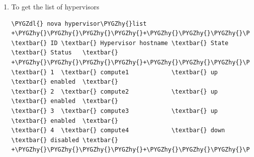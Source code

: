 \documentclass[letterpaper,10pt,english]{sphinxmanual}
\def\PYGZdl{\char`\$}
\def\PYGZhy{\char`\-}
\begin{document}
\begin{enumerate}
\begin{Verbatim}[commandchars=\\\{\}]
+\PYGZhy{}\PYGZhy{}\PYGZhy{}\PYGZhy{}\PYGZhy{}\PYGZhy{}\PYGZhy{}\PYGZhy{}\PYGZhy{}\PYGZhy{}\PYGZhy{}\PYGZhy{}\PYGZhy{}\PYGZhy{}\PYGZhy{}\PYGZhy{}\PYGZhy{}\PYGZhy{}+\PYGZhy{}\PYGZhy{}\PYGZhy{}\PYGZhy{}\PYGZhy{}\PYGZhy{}\PYGZhy{}\PYGZhy{}\PYGZhy{}\PYGZhy{}\PYGZhy{}\PYGZhy{}+\PYGZhy{}\PYGZhy{}\PYGZhy{}\PYGZhy{}\PYGZhy{}\PYGZhy{}+\PYGZhy{}\PYGZhy{}\PYGZhy{}\PYGZhy{}\PYGZhy{}\PYGZhy{}\PYGZhy{}\PYGZhy{}\PYGZhy{}+\PYGZhy{}\PYGZhy{}\PYGZhy{}\PYGZhy{}\PYGZhy{}\PYGZhy{}\PYGZhy{}+\PYGZhy{}\PYGZhy{}\PYGZhy{}\PYGZhy{}\PYGZhy{}\PYGZhy{}\PYGZhy{}\PYGZhy{}\PYGZhy{}\PYGZhy{}\PYGZhy{}\PYGZhy{}\PYGZhy{}\PYGZhy{}\PYGZhy{}\PYGZhy{}\PYGZhy{}\PYGZhy{}\PYGZhy{}\PYGZhy{}\PYGZhy{}\PYGZhy{}\PYGZhy{}\PYGZhy{}\PYGZhy{}\PYGZhy{}\PYGZhy{}\PYGZhy{}+\PYGZhy{}\PYGZhy{}\PYGZhy{}\PYGZhy{}\PYGZhy{}\PYGZhy{}\PYGZhy{}\PYGZhy{}\PYGZhy{}\PYGZhy{}\PYGZhy{}\PYGZhy{}\PYGZhy{}\PYGZhy{}\PYGZhy{}\PYGZhy{}\PYGZhy{}+
\end{Verbatim}

\item {} 
To get the list of hypervisors

\begin{Verbatim}[commandchars=\\\{\}]
\PYGZdl{} nova hypervisor\PYGZhy{}list
+\PYGZhy{}\PYGZhy{}\PYGZhy{}\PYGZhy{}+\PYGZhy{}\PYGZhy{}\PYGZhy{}\PYGZhy{}\PYGZhy{}\PYGZhy{}\PYGZhy{}\PYGZhy{}\PYGZhy{}\PYGZhy{}\PYGZhy{}\PYGZhy{}\PYGZhy{}\PYGZhy{}\PYGZhy{}\PYGZhy{}\PYGZhy{}\PYGZhy{}\PYGZhy{}\PYGZhy{}\PYGZhy{}+\PYGZhy{}\PYGZhy{}\PYGZhy{}\PYGZhy{}\PYGZhy{}\PYGZhy{}\PYGZhy{}+\PYGZhy{}\PYGZhy{}\PYGZhy{}\PYGZhy{}\PYGZhy{}\PYGZhy{}\PYGZhy{}\PYGZhy{}\PYGZhy{}\PYGZhy{}+
\textbar{} ID \textbar{} Hypervisor hostname \textbar{} State \textbar{} Status   \textbar{}
+\PYGZhy{}\PYGZhy{}\PYGZhy{}\PYGZhy{}+\PYGZhy{}\PYGZhy{}\PYGZhy{}\PYGZhy{}\PYGZhy{}\PYGZhy{}\PYGZhy{}\PYGZhy{}\PYGZhy{}\PYGZhy{}\PYGZhy{}\PYGZhy{}\PYGZhy{}\PYGZhy{}\PYGZhy{}\PYGZhy{}\PYGZhy{}\PYGZhy{}\PYGZhy{}\PYGZhy{}\PYGZhy{}+\PYGZhy{}\PYGZhy{}\PYGZhy{}\PYGZhy{}\PYGZhy{}\PYGZhy{}\PYGZhy{}+\PYGZhy{}\PYGZhy{}\PYGZhy{}\PYGZhy{}\PYGZhy{}\PYGZhy{}\PYGZhy{}\PYGZhy{}\PYGZhy{}\PYGZhy{}+
\textbar{} 1  \textbar{} compute1            \textbar{} up    \textbar{} enabled  \textbar{}
\textbar{} 2  \textbar{} compute2            \textbar{} up    \textbar{} enabled  \textbar{}
\textbar{} 3  \textbar{} compute3            \textbar{} up    \textbar{} enabled  \textbar{}
\textbar{} 4  \textbar{} compute4            \textbar{} down  \textbar{} disabled \textbar{}
+\PYGZhy{}\PYGZhy{}\PYGZhy{}\PYGZhy{}+\PYGZhy{}\PYGZhy{}\PYGZhy{}\PYGZhy{}\PYGZhy{}\PYGZhy{}\PYGZhy{}\PYGZhy{}\PYGZhy{}\PYGZhy{}\PYGZhy{}\PYGZhy{}\PYGZhy{}\PYGZhy{}\PYGZhy{}\PYGZhy{}\PYGZhy{}\PYGZhy{}\PYGZhy{}\PYGZhy{}\PYGZhy{}+\PYGZhy{}\PYGZhy{}\PYGZhy{}\PYGZhy{}\PYGZhy{}\PYGZhy{}\PYGZhy{}+\PYGZhy{}\PYGZhy{}\PYGZhy{}\PYGZhy{}\PYGZhy{}\PYGZhy{}\PYGZhy{}\PYGZhy{}\PYGZhy{}\PYGZhy{}+
\end{Verbatim}


\end{enumerate}
\end{document}
